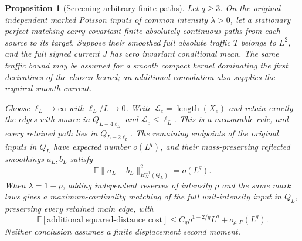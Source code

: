 \documentclass[11pt,reqno]{amsart}
\newtheorem{proposition}[theorem]{Proposition}
\theoremstyle{definition}
\theoremstyle{remark}
\numberwithin{equation}{section}
\newcommand{\E}{\mathbb E}
\begin{document}
\begin{proposition}[Screening arbitrary finite paths]
\label{prop:general-finite-path-screening}
Let $q\ge3$. On the original independent marked Poisson inputs of common
intensity $\lambda>0$, let a stationary perfect matching carry covariant
finite absolutely continuous paths from each source to its target.
Suppose their smoothed full absolute traffic $T$ belongs to $L^2$, and
the full signed current $J$ has zero invariant conditional mean.
The same traffic bound may be assumed for a smooth compact kernel
dominating the first derivatives of the chosen kernel; an additional
convolution also supplies the required smooth current.

Choose $\ell_L\to\infty$ with $\ell_L/L\to0$. Write
$\mathcal L_e=\operatorname{length}(X_e)$ and retain exactly the edges
with source in $Q_{L-4\ell_L}$ and $\mathcal L_e\le\ell_L$.
This is a measurable rule, and every retained path lies in
$Q_{L-2\ell_L}$. The remaining endpoints of the original inputs in
$Q_L$ have expected number $o(L^q)$, and their
mass-preserving reflected smoothings $a_L,b_L$ satisfy
\begin{equation}
 \E\|a_L-b_L\|_{H_N^{-1}(Q_L)}^2=o(L^q).
 \label{eq:general-path-port-bound}
\end{equation}
When $\lambda=1-\rho$, adding independent reserves of intensity $\rho$
and the same mark laws gives a maximum-cardinality matching of the full
unit-intensity input in $Q_L$, preserving every retained main edge, with
\begin{equation}
 \E[\text{additional squared-distance cost}]
 \le C_q\rho^{1-2/q}L^q+o_{\rho,P}(L^q).
 \label{eq:general-path-reserve-bound}
\end{equation}
Neither conclusion assumes a finite displacement second moment.
\end{proposition}
\end{document}
